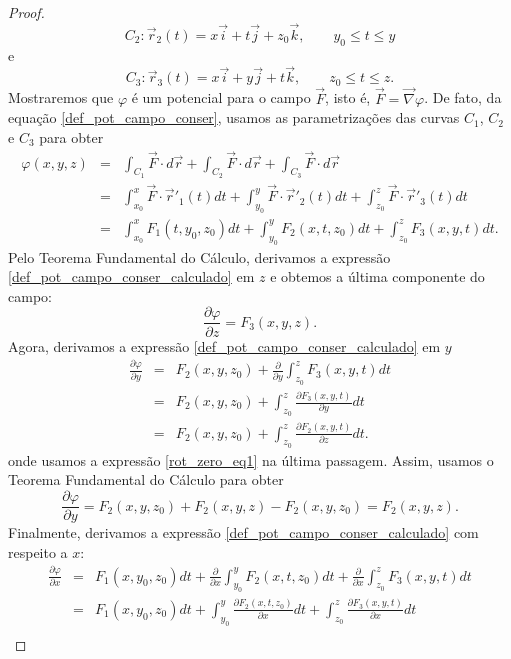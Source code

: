 \begin{proof}
$$$$ 
$$
C_2: \vec{r}_2(t)=x\vec{i}+t\vec{j}+z_0\vec{k},\qquad y_0\leq t\leq y
$$ 
e
$$
C_3: \vec{r}_3(t)=x\vec{i}+y\vec{j}+t\vec{k},\qquad z_0\leq t\leq z.
$$ 
Mostraremos que $\varphi$ é um potencial para o campo $\vec{F}$, isto é, $\vec{F}=\vec{\nabla}\varphi$. De fato, da equação \eqref{def_pot_campo_conser}, usamos as parametrizações das curvas $C_1$, $C_2$ e $C_3$ para obter
\begin{eqnarray}
\nonumber \varphi(x,y,z)&=&\int_{C_1} \vec{F}\cdot d\vec{r}+\int_{C_2} \vec{F}\cdot d\vec{r}+\int_{C_3} \vec{F}\cdot d\vec{r}\\
\nonumber&=&\int_{x_0}^x \vec{F}\cdot \vec{r}'_1(t)dt+ \int_{y_0}^y \vec{F}\cdot \vec{r}'_2(t)dt+\int_{z_0}^z \vec{F}\cdot \vec{r}'_3(t)dt\\
&=&\int_{x_0}^x F_1(t,y_0,z_0) d t+ \int_{y_0}^y F_2(x,t,z_0)dt+\int_{z_0}^z F_3(x,y,t)dt.\label{def_pot_campo_conser_calculado}
\end{eqnarray}
Pelo Teorema Fundamental do Cálculo, derivamos a expressão \eqref{def_pot_campo_conser_calculado} em $z$ e obtemos a última componente do campo:
\begin{equation}\label{gradiente_3_comp}
\frac{\partial \varphi}{\partial z}=F_3(x,y,z). 
\end{equation}
Agora, derivamos a expressão \eqref{def_pot_campo_conser_calculado} em $y$
\begin{eqnarray*}
\frac{\partial \varphi}{\partial y}&=&F_2(x,y,z_0)+\frac{\partial}{\partial y}\int_{z_0}^z F_3(x,y,t)dt\\
&=&F_2(x,y,z_0)+\int_{z_0}^z \frac{\partial F_3(x,y,t)}{\partial y}dt\\ 
&=&F_2(x,y,z_0)+\int_{z_0}^z \frac{\partial F_2(x,y,t)}{\partial z}dt. 
\end{eqnarray*}
onde usamos a expressão \eqref{rot_zero_eq1} na última passagem. Assim, usamos o Teorema Fundamental do Cálculo para obter
\begin{equation}\label{gradiente_2_comp}
\frac{\partial \varphi}{\partial y}=F_2(x,y,z_0)+F_2(x,y,z)-F_2(x,y,z_0)=F_2(x,y,z). 
\end{equation}
Finalmente, derivamos a expressão \eqref{def_pot_campo_conser_calculado} com respeito a $x$:
\begin{eqnarray*}
\frac{\partial \varphi}{\partial x}&=&F_1(x,y_0,z_0) d t+ \frac{\partial}{\partial x}\int_{y_0}^y F_2(x,t,z_0)dt+ \frac{\partial}{\partial x}\int_{z_0}^z F_3(x,y,t)dt\\
&=&F_1(x,y_0,z_0) d t+ \int_{y_0}^y \frac{\partial F_2(x,t,z_0)}{\partial x}dt+ \int_{z_0}^z \frac{\partial F_3(x,y,t)}{\partial x}dt\\

\end{eqnarray*}
\end{proof}
